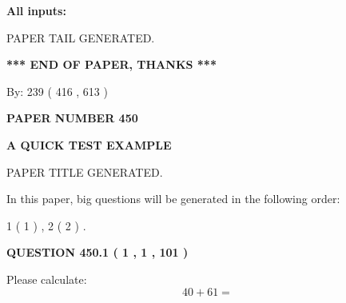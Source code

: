 \documentclass[12pt]{article}
\begin{document}
   
\noindent{}
   
   
   
   
\noindent\vspace{0.1in}\hspace{-0.08in} {\textbf{\Large{All inputs: }}}
   
   
   
   
   
   
 \vspace{0.2in}
 
   
   
\vspace{2.0in} PAPER TAIL GENERATED.
   
   
   
   
\vspace{1.0in} 
{\textbf{\large{ *** END OF PAPER, THANKS *** }}} 
   
   
\hspace{1.0in} By: 
 239 ( 416 ,  613 )
   
   
   
   
\newpage 
\setcounter{page}{ 
   450001 } 
   
   
   
   
 {\textbf{ \Large{ PAPER NUMBER  450  }}}
   
   
\vspace{0.2in}
   
   
   
   
   
   
   
   
 \vspace{0.2in}
{\LARGE {\textbf{ A QUICK TEST EXAMPLE}}}
   
   
 PAPER TITLE GENERATED.
   
   
   
\vspace{0.2in}
   
In this paper, big questions will be generated in the following order: 
   
   
   1 ( 1 )
 ,
   2 ( 2 )
 .
  
\vspace{0.2in}
  
{\textbf{\Large{QUESTION
450.1 
 ( 1 , 1 , 101 )
}}}
  
  
 
Please calculate:
\begin{equation}
40 +  %
61 = \nonumber
\end{equation}
 
\end{document}
